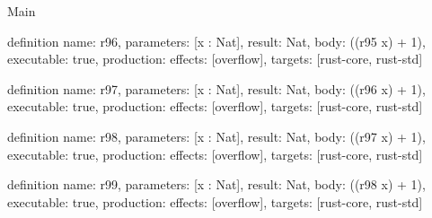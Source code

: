 \begin{lexlean}{Main}
\begin{semanticmodule}
definition{
  name: r96,
  parameters: [x : Nat],
  result: Nat,
  body: ((r95 x) + 1),
  executable: true,
  production: {effects: [overflow], targets: [rust-core, rust-std]}
}

definition{
  name: r97,
  parameters: [x : Nat],
  result: Nat,
  body: ((r96 x) + 1),
  executable: true,
  production: {effects: [overflow], targets: [rust-core, rust-std]}
}

definition{
  name: r98,
  parameters: [x : Nat],
  result: Nat,
  body: ((r97 x) + 1),
  executable: true,
  production: {effects: [overflow], targets: [rust-core, rust-std]}
}

definition{
  name: r99,
  parameters: [x : Nat],
  result: Nat,
  body: ((r98 x) + 1),
  executable: true,
  production: {effects: [overflow], targets: [rust-core, rust-std]}
}
\end{semanticmodule}
\end{lexlean}
